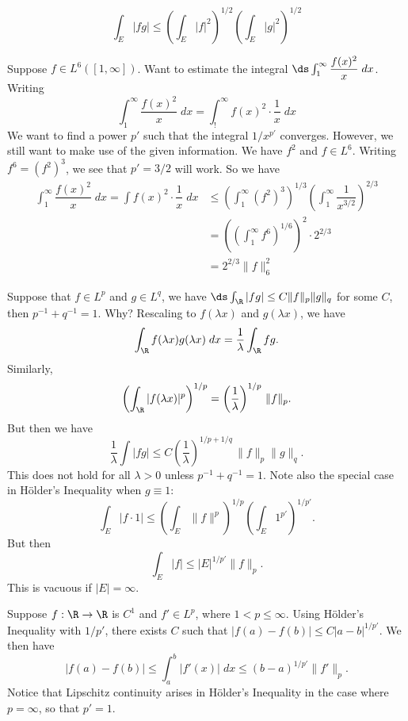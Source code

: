 \begin{cor}
	\[ \int_E |fg| \leq \left( \int_E |f|^2 \right)^{1/2} \left( \int_E |g|^2 \right)^{1/2} \]
\end{cor}


\begin{ex}
Suppose $f \in L^6([1,\infty])$. Want to estimate the integral $\ds \int_1^\infty \dfrac{f(x)^2}{x} \; dx$. Writing 
	\[
	\int_1^\infty \dfrac{f(x)^2}{x} \; dx= \int_!^\infty f(x)^2 \cdot \dfrac{1}{x} \; dx
	\]
We want to find a power $p'$ such that the integral $1/x^{p'}$ converges. However, we still want to make use of the given information. We have $f^2$ and $f \in L^6$. Writing $f^6=(f^2)^3$, we see that $p'= 3/2$ will work. So we have
	\[
	\begin{split}
	\int_1^\infty \dfrac{f(x)^2}{x} \; dx= \int f(x)^2 \cdot \dfrac{1}{x} \; dx  &\leq \left( \int_1^\infty (f^2)^3 \right)^{1/3} \left( \int_1^\infty \dfrac{1}{x^{3/2}} \right)^{2/3} \\
	&= \left( \left( \int_1^\infty f^6 \right)^{1/6} \right)^2 \cdot 2^{2/3} \\
	&= 2^{2/3} \|f\|_6^2
	\end{split}
	\]
\end{ex} \xqed


Suppose that $f \in L^p$ and $g \in L^q$, we have $\ds\int_\R |fg| \leq C \|f\|_p \|g\|_q$ for some $C$, then $p^{-1} + q^{-1}= 1$. Why? Rescaling to $f(\lambda x)$ and $g(\lambda x)$, we have
	\[
	\int_\R f(\lambda x) g(\lambda x) \; dx = \dfrac{1}{\lambda} \int_\R fg.
	\]
Similarly, 
	\[
	\left(\int_\R |f(\lambda x)|^p \right)^{1/p}= \left(\dfrac{1}{\lambda}\right)^{1/p} \, \|f\|_p.
	\]
But then we have
	\[
	\dfrac{1}{\lambda} \int |fg| \leq C \left( \dfrac{1}{\lambda} \right)^{1/p+1/q} \, \|f\|_p \|g\|_q.
	\]
This does not hold for all $\lambda>0$ unless $p^{-1} + q^{-1}= 1$. Note also the special case in H\"older's Inequality when $g \equiv 1$:
	\[
	\int_E |f \cdot 1| \leq \left( \int_E \|f\|^p \right)^{1/p} \left( \int_E 1^{p'} \right)^{1/p'}.
	\]
 But then 
 	\[
	\int_E |f| \leq |E|^{1/p'} \|f\|_p.
	\]
 This is vacuous if $|E|= \infty$. 


\begin{ex}
Suppose $f: \R \to \R$ is $C^1$ and $f' \in L^p$, where $1< p \leq \infty$. Using H\"older's Inequality with $1/p'$, there exists $C$ such that $|f(a)-f(b)| \leq C |a-b|^{1/p'}$. We then have
	\[
	| f(a) - f(b)| \leq \int_a^b |f'(x)| \; dx \leq (b-a)^{1/p'} \|f'\|_p.
	\]
Notice that Lipschitz continuity arises in H\"older's Inequality in the case where $p=\infty$, so that $p'=1$. 
\end{ex} \xqed 


